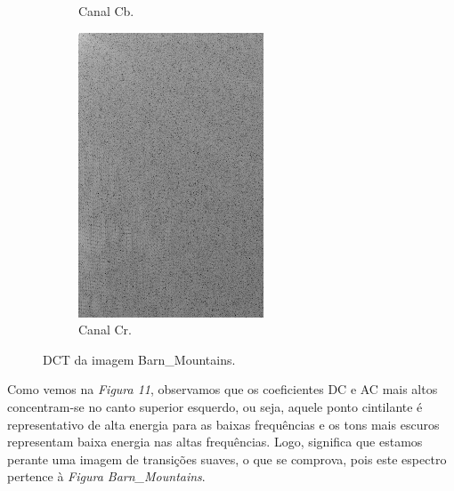 \documentclass[a4paper, 12pt]{article}
\begin{document}
\begin{figure}[H]
\begin{subfigure}{0.3\textwidth}
                \caption{ Canal Cb.}
            \end{subfigure}
            \hfill
            \begin{subfigure}{0.3\textwidth}
                \centering
                \includegraphics[scale=0.5]{resources/DCT/CRdct.png} 
                \caption{ Canal Cr.}
            \end{subfigure}
            \caption{ DCT da imagem Barn\_Mountains.}
            \label{fig:my_label}
        \end{figure}

        Como vemos na \emph{Figura 11}, observamos que os coeficientes DC e AC mais
        altos
        concentram-se no canto superior esquerdo, ou seja, aquele ponto cintilante é
        representativo de alta energia para as baixas frequências e os tons mais escuros 
        representam baixa energia nas altas frequências.
        Logo, significa que estamos perante uma imagem de transições suaves, o que se comprova, pois
        este espectro pertence à \emph{Figura Barn\_Mountains}.
\end{document}
